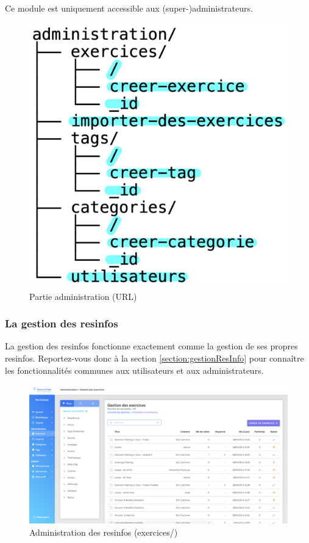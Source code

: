 Ce module est uniquement accessible aux (super-)administrateurs.

\begin{figure}[H]
    \includegraphics[width=\textwidth,height=0.25\textheight,keepaspectratio]{images/client/administration.jpeg}
    \centering
    \caption[SourceCode : partie administration (URL)]{Partie administration (URL)}
\end{figure}

\subsubsection{La gestion des \glspl{resinfo}}
\label{section:resInfoAdmin}

La gestion des \glspl{resinfo} fonctionne exactement comme la gestion de ses propres \glspl{resinfo}. Reportez-vous donc à la section \ref{section:gestionResInfo} pour connaître les fonctionnalités communes aux utilisateurs et aux administrateurs.

\begin{figure}[H]
    \includegraphics[width=\textwidth,height=\textheight,keepaspectratio]{images/client/admin-exercises.png}
    \centering
    \caption[SourceCode : administration des \glspl{resinfo}]{Administration des \glspl{resinfo} (exercices/)}
\end{figure}

